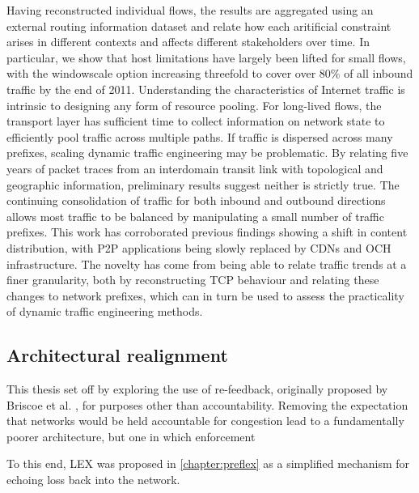 Having reconstructed individual flows, the results are aggregated using an external routing information dataset and relate how each aritificial constraint arises in different contexts and affects different stakeholders over time. 
In particular, we show that host limitations have largely been lifted for small flows, with the windowscale option increasing threefold to cover over 80\% of all inbound traffic by the end of 2011. 
Understanding the characteristics of Internet traffic is intrinsic to designing any form of resource pooling.
For long-lived flows, the transport layer has sufficient time to collect information on network state to efficiently pool traffic across multiple paths.
If traffic is dispersed across many prefixes, scaling dynamic traffic engineering may be problematic.
By relating five years of packet traces from an interdomain transit link with topological and geographic information, preliminary results suggest neither is strictly true.
The continuing consolidation of traffic for both inbound and outbound directions allows most traffic to be balanced by manipulating a small number of traffic prefixes.
This work has corroborated previous findings \cite{Labovitz:2010p175} showing a shift in content distribution, with \acf{P2P} applications being slowly replaced by \acfp{CDN} and \acf{OCH} infrastructure.
The novelty has come from being able to relate traffic trends at a finer granularity, both by reconstructing \ac{TCP} behaviour and relating these changes to network prefixes, which can in turn be used to assess the practicality of dynamic traffic engineering methods.


\subsection{Architectural realignment}

This thesis set off by exploring the use of re-feedback, originally proposed by Briscoe et al. \cite{}, for purposes other than accountability.
Removing the expectation that networks would be held accountable for congestion lead to a fundamentally poorer architecture, but one in which enforcement


To this end, \ac{LEX} was proposed in \ref{chapter:preflex} as a simplified mechanism for echoing loss back into the network.


